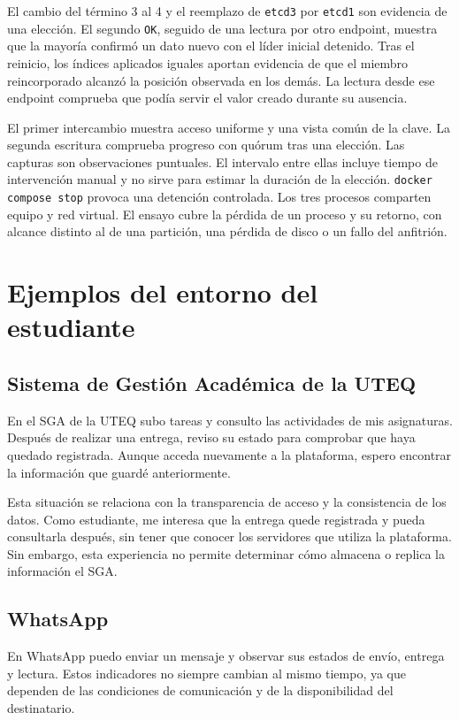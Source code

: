 \documentclass[11pt,a4paper]{article}
\begin{document}
El cambio del término 3 al 4 y el reemplazo de \texttt{etcd3} por \texttt{etcd1} son evidencia de una elección. El segundo \texttt{OK}, seguido de una lectura por otro endpoint, muestra que la mayoría confirmó un dato nuevo con el líder inicial detenido. Tras el reinicio, los índices aplicados iguales aportan evidencia de que el miembro reincorporado alcanzó la posición observada en los demás. La lectura desde ese endpoint comprueba que podía servir el valor creado durante su ausencia.

El primer intercambio muestra acceso uniforme y una vista común de la clave. La segunda escritura comprueba progreso con quórum tras una elección. Las capturas son observaciones puntuales. El intervalo entre ellas incluye tiempo de intervención manual y no sirve para estimar la duración de la elección. \texttt{docker compose stop} provoca una detención controlada. Los tres procesos comparten equipo y red virtual. El ensayo cubre la pérdida de un proceso y su retorno, con alcance distinto al de una partición, una pérdida de disco o un fallo del anfitrión.
\section{Ejemplos del entorno del estudiante}

\subsection{Sistema de Gestión Académica de la UTEQ}

En el SGA de la UTEQ subo tareas y consulto las actividades de mis asignaturas. Después de realizar una entrega, reviso su estado para comprobar que haya quedado registrada. Aunque acceda nuevamente a la plataforma, espero encontrar la información que guardé anteriormente.

Esta situación se relaciona con la transparencia de acceso y la consistencia de los datos. Como estudiante, me interesa que la entrega quede registrada y pueda consultarla después, sin tener que conocer los servidores que utiliza la plataforma. Sin embargo, esta experiencia no permite determinar cómo almacena o replica la información el SGA.

\subsection{WhatsApp}

En WhatsApp puedo enviar un mensaje y observar sus estados de envío, entrega y lectura. Estos indicadores no siempre cambian al mismo tiempo, ya que dependen de las condiciones de comunicación y de la disponibilidad del destinatario.
\end{document}
